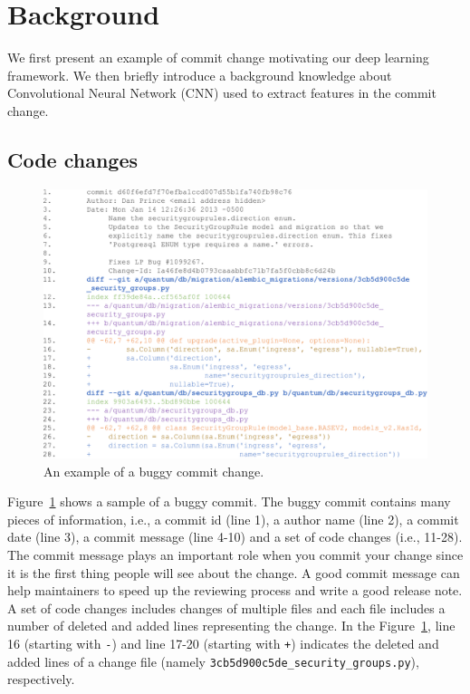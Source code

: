 

\section{Background}
\label{sec:background}

We first present an example of commit change motivating our deep learning framework. We then briefly introduce a background knowledge about Convolutional Neural Network (CNN) used to extract features in the commit change. 

\subsection{Code changes}\label{sec:examle}
\begin{figure}[t!]
\center
\includegraphics[scale=0.2]{figs/example.pdf}
\caption{An example of a buggy commit change.}
\label{fig:example}
\end{figure} 
Figure~\ref{fig:example} shows a sample of a buggy commit. The buggy commit contains many pieces of information, i.e., a commit id (line 1), a author name (line 2), a commit date (line 3), a commit message (line 4-10) and a set of code changes (i.e., 11-28). The commit message plays an important role when you commit your change since it is the first thing people will see about the change. A good commit message can help maintainers to speed up the reviewing process and write a good release note. A set of code changes includes changes of multiple files and each file includes a number of deleted and added lines representing the change. In the Figure~\ref{fig:example}, line 16 (starting with \texttt{-}) and line 17-20 (starting with \texttt{+}) indicates the deleted and added lines of a change file (namely \texttt{3cb5d900c5de\_security\_groups.py}), respectively. 

